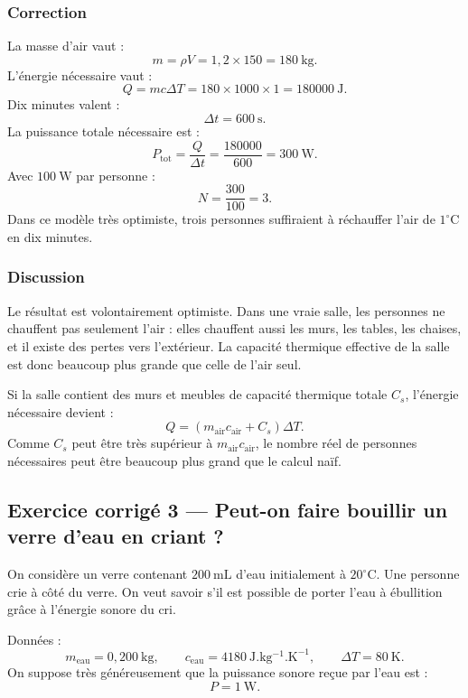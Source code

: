\documentclass[11pt,a4paper]{article}
\begin{document}
\subsubsection*{Correction}

\begin{corrigebox}
La masse d'air vaut :
\[
m=\rho V=1{,}2\times150=180\ \mathrm{kg}.
\]
L'énergie nécessaire vaut :
\[
Q=mc\Delta T=180\times1000\times1=180000\ \mathrm J.
\]
Dix minutes valent :
\[
\Delta t=600\ \mathrm s.
\]
La puissance totale nécessaire est :
\[
P_{\mathrm{tot}}=\frac{Q}{\Delta t}=\frac{180000}{600}=300\ \mathrm W.
\]
Avec \(100\ \mathrm W\) par personne :
\[
N=\frac{300}{100}=3.
\]
Dans ce modèle très optimiste, trois personnes suffiraient à réchauffer l'air de \(1^\circ\mathrm C\) en dix minutes.
\end{corrigebox}

\subsubsection*{Discussion}

\begin{attentionbox}
Le résultat est volontairement optimiste. Dans une vraie salle, les personnes ne chauffent pas seulement l'air : elles chauffent aussi les murs, les tables, les chaises, et il existe des pertes vers l'extérieur. La capacité thermique effective de la salle est donc beaucoup plus grande que celle de l'air seul.
\end{attentionbox}

\begin{approfondissementbox}
Si la salle contient des murs et meubles de capacité thermique totale \(C_s\), l'énergie nécessaire devient :
\[
Q=(m_{\mathrm{air}}c_{\mathrm{air}}+C_s)\Delta T.
\]
Comme \(C_s\) peut être très supérieur à \(m_{\mathrm{air}}c_{\mathrm{air}}\), le nombre réel de personnes nécessaires peut être beaucoup plus grand que le calcul naïf.
\end{approfondissementbox}

\subsection{Exercice corrigé 3 — Peut-on faire bouillir un verre d'eau en criant ?}

\begin{exercicebox}
On considère un verre contenant \(200\ \mathrm{mL}\) d'eau initialement à \(20^\circ\mathrm C\). Une personne crie à côté du verre. On veut savoir s'il est possible de porter l'eau à ébullition grâce à l'énergie sonore du cri.

Données :
\[
m_{\mathrm{eau}}=0{,}200\ \mathrm{kg},
\qquad
c_{\mathrm{eau}}=4180\ \mathrm{J.kg^{-1}.K^{-1}},
\qquad
\Delta T=80\ \mathrm K.
\]
On suppose très généreusement que la puissance sonore reçue par l'eau est :
\[
P=1\ \mathrm W.
\]
\end{exercicebox}
\end{document}

